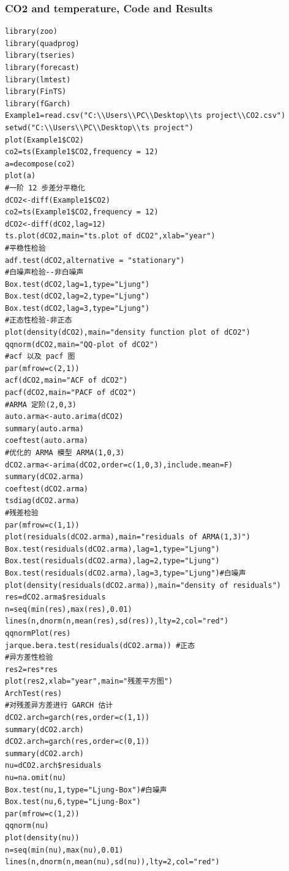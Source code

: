 \documentclass[a4paper,11pt]{article}
\begin{document}
\subsubsection{CO2 and temperature, Code and Results}
\begin{verbatim}
library(zoo)
library(quadprog)
library(tseries)
library(forecast)
library(lmtest)
library(FinTS)
library(fGarch)
Example1=read.csv("C:\\Users\\PC\\Desktop\\ts project\\CO2.csv")
setwd("C:\\Users\\PC\\Desktop\\ts project")
plot(Example1$CO2)
co2=ts(Example1$CO2,frequency = 12)
a=decompose(co2)
plot(a)
#一阶 12 步差分平稳化
dCO2<-diff(Example1$CO2)
co2=ts(Example1$CO2,frequency = 12)
dCO2<-diff(dCO2,lag=12)
ts.plot(dCO2,main="ts.plot of dCO2",xlab="year")
#平稳性检验
adf.test(dCO2,alternative = "stationary")
#白噪声检验--非白噪声
Box.test(dCO2,lag=1,type="Ljung")
Box.test(dCO2,lag=2,type="Ljung")
Box.test(dCO2,lag=3,type="Ljung")
#正态性检验-非正态
plot(density(dCO2),main="density function plot of dCO2")
qqnorm(dCO2,main="QQ-plot of dCO2")
#acf 以及 pacf 图
par(mfrow=c(2,1))
acf(dCO2,main="ACF of dCO2")
pacf(dCO2,main="PACF of dCO2")
#ARMA 定阶(2,0,3)
auto.arma<-auto.arima(dCO2)
summary(auto.arma)
coeftest(auto.arma)
#优化的 ARMA 模型 ARMA(1,0,3)
dCO2.arma<-arima(dCO2,order=c(1,0,3),include.mean=F)
summary(dCO2.arma)
coeftest(dCO2.arma)
tsdiag(dCO2.arma)
#残差检验
par(mfrow=c(1,1))
plot(residuals(dCO2.arma),main="residuals of ARMA(1,3)")
Box.test(residuals(dCO2.arma),lag=1,type="Ljung")
Box.test(residuals(dCO2.arma),lag=2,type="Ljung")
Box.test(residuals(dCO2.arma),lag=3,type="Ljung")#白噪声
plot(density(residuals(dCO2.arma)),main="density of residuals")
res=dCO2.arma$residuals
n=seq(min(res),max(res),0.01)
lines(n,dnorm(n,mean(res),sd(res)),lty=2,col="red")
qqnormPlot(res)
jarque.bera.test(residuals(dCO2.arma)) #正态
#异方差性检验
res2=res*res
plot(res2,xlab="year",main="残差平方图")
ArchTest(res)
#对残差异方差进行 GARCH 估计
dCO2.arch=garch(res,order=c(1,1))
summary(dCO2.arch)
dCO2.arch=garch(res,order=c(0,1))
summary(dCO2.arch)
nu=dCO2.arch$residuals
nu=na.omit(nu)
Box.test(nu,1,type="Ljung-Box")#白噪声
Box.test(nu,6,type="Ljung-Box")
par(mfrow=c(1,2))
qqnorm(nu)
plot(density(nu))
n=seq(min(nu),max(nu),0.01)
lines(n,dnorm(n,mean(nu),sd(nu)),lty=2,col="red")

\end{verbatim}
\end{document}
